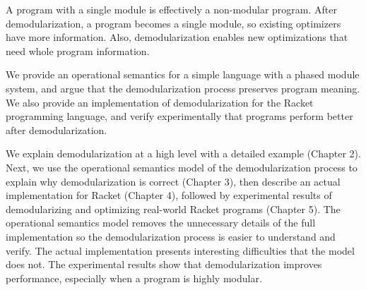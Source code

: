 A program with a single module is effectively a non-modular program. After demodularization, a program becomes a single module, so existing optimizers have more information. Also, demodularization enables new optimizations that need whole program information. 

We provide an operational semantics for a simple language with a phased module system, and argue that the demodularization process preserves program meaning. We also provide an implementation of demodularization for the Racket programming language, and verify experimentally that programs perform better after demodularization.

We explain demodularization at a high level with a detailed example (Chapter 2). Next, we use the operational semantics model of the demodularization process to explain why demodularization is correct (Chapter 3), then describe an actual implementation for Racket (Chapter 4), followed by experimental results of demodularizing and optimizing real-world Racket programs (Chapter 5). The operational semantics model removes the unnecessary details of the full implementation so the demodularization process is easier to understand and verify. The actual implementation presents interesting difficulties that the model does not. The experimental results show that demodularization improves performance, especially when a program is highly modular. 
